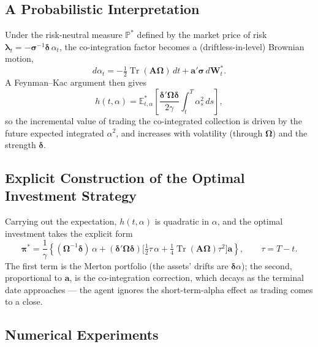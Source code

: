\documentclass[11pt]{article}
\newcommand{\E}{\mathbb{E}}
\newcommand{\Prob}{\mathbb{P}}
\newcommand{\dd}{\,d}
\DeclareMathOperator{\Tr}{Tr}
\begin{document}
\subsection{A Probabilistic Interpretation}

Under the risk-neutral measure $\Prob^*$ defined by the market price of risk
$\bm\lambda_t = -\bm\sigma^{-1}\bm\delta\,\alpha_t$, the co-integration factor becomes a
(driftless-in-level) Brownian motion,
\begin{equation}\label{eq:1113}
  d\alpha_t = -\tfrac12\Tr(\bm A\bm\Omega)\dd t + \bm a'\bm\sigma\dd\bm W^*_t. \tag{11.13}
\end{equation}
A Feynman--Kac argument then gives
\begin{equation}\label{eq:1114}
  h(t,\alpha) = \E^*_{t,\alpha}\!\left[\frac{\bm\delta'\bm\Omega\bm\delta}{2\gamma}\int_t^T \alpha_s^2\dd s\right], \tag{11.14}
\end{equation}
so the incremental value of trading the co-integrated collection is driven by the future expected
integrated $\alpha^2$, and increases with volatility (through $\bm\Omega$) and the strength
$\bm\delta$.

\subsection{Explicit Construction of the Optimal Investment Strategy}

Carrying out the expectation, $h(t,\alpha)$ is quadratic in $\alpha$, and the optimal investment takes
the explicit form
\begin{equation}\label{eq:1116}
  \bm\pi^* = \frac1\gamma\left\{(\bm\Omega^{-1}\bm\delta)\,\alpha
    + (\bm\delta'\bm\Omega\bm\delta)\Big[\tfrac12\tau\,\alpha + \tfrac14\Tr(\bm A\bm\Omega)\tau^2\Big]\bm a\right\},
  \qquad \tau = T-t. \tag{11.16}
\end{equation}
The first term is the Merton portfolio (the assets' drifts are $\bm\delta\alpha$); the second,
proportional to $\bm a$, is the co-integration correction, which decays as the terminal date
approaches --- the agent ignores the short-term-alpha effect as trading comes to a close.

\subsection{Numerical Experiments}
\end{document}
